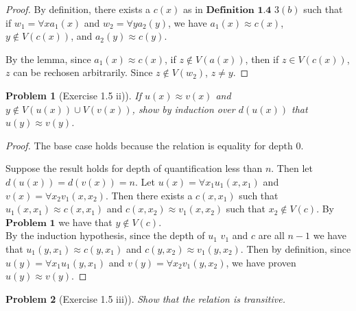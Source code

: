 \documentclass{article}
\theoremstyle{problemstyle}
\newtheorem{problem}{Problem}
\theoremstyle{lemmastyle}
\theoremstyle{theoremstyle}
\begin{document}
\begin{proof}
By definition, there exists a $c(x)$ as in $\textbf{Definition 1.4}$ $3 (b)$ such that if $w_1 = \forall x a_1(x)$ and $w_2 = \forall y a_2(y)$, we have $a_1(x) \approx c(x)$, $y \notin V(c(x))$, and $a_2(y) \approx c(y)$. 

By the lemma, since $a_1(x) \approx c(x)$, if $z \notin V(a(x))$, then if $z \in V(c(x))$, $z$ can be rechosen arbitrarily. Since $z \notin V(w_2)$, $z \neq y$. 
\end{proof}

\begin{problem}[Exercise 1.5 ii)]
If $u(x) \approx v(x)$ and $y \notin V(u(x)) \cup V(v(x))$, show by induction over $d(u(x))$ that $u(y) \approx v(y)$.
\end{problem}

\begin{proof}
The base case holds because the relation is equality for depth $0$. 

Suppose the result holds for depth of quantification less than $n$. Then let $d(u(x)) = d(v(x)) = n$.  Let $u(x) = \forall x_1 u_1(x,x_1)$ and $v(x) = \forall x_2 v_1(x,x_2)$. Then there exists a $c(x,x_1)$  such that $u_1(x,x_1) \approx c(x,x_1)$ and $c(x,x_2) \approx v_1(x,x_2)$ such that $x_2 \notin V(c)$. By $\textbf{Problem 1}$ we have that $y \notin V(c)$.\\

By the induction hypothesis, since the depth of $u_1$ $v_1$ and $c$ are all $n-1$ we have that $u_1(y,x_1) \approx c(y,x_1)$ and $c(y,x_2) \approx v_1(y,x_2)$. Then by definition, since $u(y) = \forall x_1 u_1(y,x_1)$ and $v(y) = \forall x_2 v_1(y,x_2)$, we have proven $u(y) \approx v(y)$.
\end{proof}

\begin{problem}[Exercise 1.5 iii)]
Show that the relation is transitive. 
\end{problem}
\end{document}
